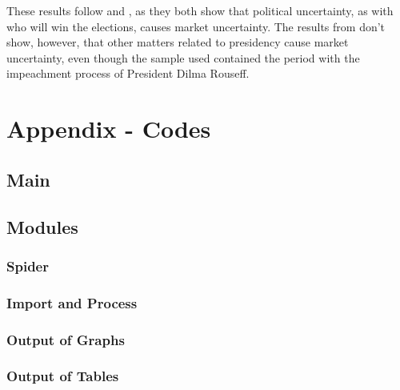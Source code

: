 \documentclass[cic,tc, english]{iiufrgs}
\begin{document}
    These results follow \cite{smales2015} and \cite{marquessantos2016}, as they both show that political uncertainty, as with who will win the elections, causes market uncertainty. The results from \cite{marquessantos2016} don't show, however, that other matters related to presidency cause market uncertainty, even though the sample used contained the period with the impeachment process of President Dilma Rouseff.



















    
\chapter{Appendix - Codes} \label{chapter_appendix}

\section{Main}

    

\section{Modules}

\subsection{Spider}

    

\subsection{Import and Process}

    

\subsection{Output of Graphs}

    

\subsection{Output of Tables}

    


 \label{chapter_bibliography}
\end{document}
